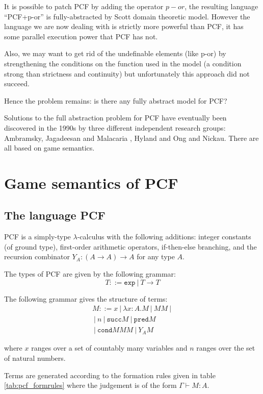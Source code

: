 It is possible to patch PCF by adding the operator $p-or$, the
resulting language ``PCF+p-or'' is fully-abstracted by Scott domain
theoretic model. However the language we are now dealing with is
strictly more powerful than PCF, it has some parallel execution
power that PCF has not.

Also, we may want to get rid of the undefinable elements (like p-or)
by strengthening the conditions on the function used in the model (a
condition strong than strictness and continuity) but unfortunately
this approach did not succeed.

Hence the problem remains: is there any fully abstract model for
PCF?

Solutions to the full abstraction problem for PCF have eventually
been discovered in the 1990s by three different independent research
groups: Ambramsky, Jagadeesan and Malacaria \cite{abramsky94full},
Hyland and Ong \cite{hylandong_pcf} and Nickau. There are all based
on game semantics.


\section{Game semantics of PCF}
\subsection{The language PCF}
PCF is a simply-type $\lambda$-calculus with the following
additions: integer constants  (of ground type), first-order
arithmetic operators, if-then-else branching, and the recursion
combinator $Y_A : (A\rightarrow A)\rightarrow A$ for any type $A$.

The types of PCF are given by the following grammar:
$$ T ::= \texttt{exp}\ |\ T \rightarrow T$$

The following grammar gives the structure of terms:
\begin{eqnarray*}
 M ::= x\ |\ \lambda x :A . M \ |\ M M \ |\ \\
\ |\ n \ |\ \texttt{succ} M \ |\  \texttt{pred} M \\
\ |\ \texttt{cond} M M M \ |\ Y_A M
\end{eqnarray*}

where $x$ ranges over a set of countably many variables and $n$
ranges over the set of natural numbers.

Terms are generated according to the formation rules given in table
\ref{tab:pcf_formrules} where the judgement is of the form $ \Gamma  \vdash M : A$.

